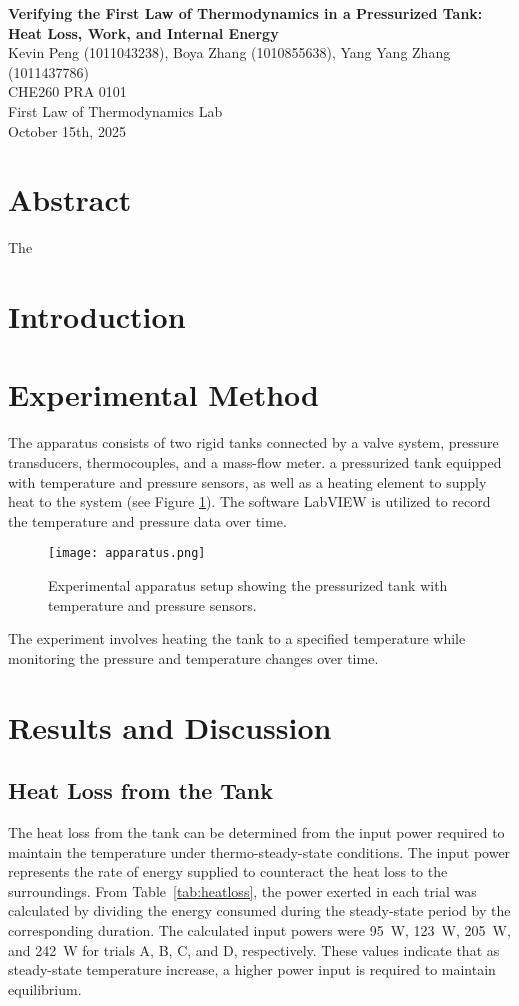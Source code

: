 \documentclass[12pt]{article}
\begin{document}
\begin{center}
\textbf{\Large Verifying the First Law of Thermodynamics in a Pressurized Tank: Heat Loss, Work, and Internal Energy} \\[0.5em]
Kevin Peng (1011043238), Boya Zhang (1010855638), Yang Yang Zhang (1011437786)\\[0.5em]
CHE260 PRA 0101 \\
First Law of Thermodynamics Lab \\
October 15th, 2025 \\
\end{center}

\section*{Abstract}
The 

\section{Introduction}

\section{Experimental Method}
The apparatus consists of two rigid tanks connected by a valve system, pressure transducers, thermocouples, and a mass-flow meter.
a pressurized tank equipped with temperature and pressure sensors, as well as a heating element to supply heat to the system (see Figure \ref{fig:apparatus}).
The software LabVIEW is utilized to record the temperature and pressure data over time.
\begin{figure}[H]
    \centering
    \texttt{[image: apparatus.png]}
    \caption{Experimental apparatus setup showing the pressurized tank with temperature and pressure sensors.}
    \label{fig:apparatus}
\end{figure}


The experiment involves heating the tank to a specified temperature while monitoring the pressure and temperature changes over time.


\section{Results and Discussion}
\subsection{Heat Loss from the Tank}
The heat loss from the tank can be determined from the input power required to maintain the temperature under thermo-steady-state conditions. The input power represents the rate of energy supplied to counteract the heat loss to the surroundings. From Table~\ref{tab:heatloss}, the power exerted in each trial was calculated by dividing the energy consumed during the steady-state period by the corresponding duration. The calculated input powers were 95~W, 123~W, 205~W, and 242~W for trials A, B, C, and D, respectively. These values indicate that as steady-state temperature increase, a higher power input is required to maintain equilibrium.
\end{document}
